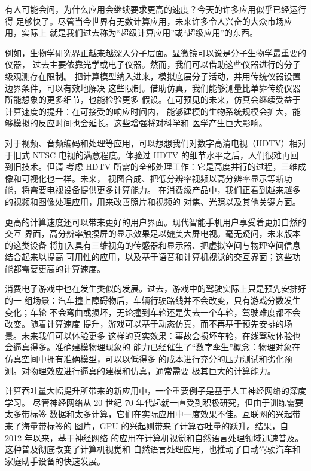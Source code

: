 有人可能会问，为什么应用会继续要求更高的速度？今天的许多应用似乎已经运行得
足够快了。尽管当今世界有无数计算应用，未来许多令人兴奋的大众市场应用，实际上
就是我们过去称为“超级计算应用”或“超级应用”的东西。

例如，生物学研究界正越来越深入分子层面。显微镜可以说是分子生物学最重要的仪器，
过去主要依靠光学或电子仪器。然而，我们可以借助这些仪器进行的分子级观测存在限制。
把计算模型纳入进来，模拟底层分子活动，并用传统仪器设置边界条件，可以有效地解决
这些限制。借助仿真，我们能够测量比单靠传统仪器所能想象的更多细节，也能检验更多
假设。在可预见的未来，仿真会继续受益于计算速度的提升：在可接受的响应时间内，
能够建模的生物系统规模会扩大，能够模拟的反应时间也会延长。这些增强将对科学和
医学产生巨大影响。

对于视频、音频编码和处理等应用，可以想想我们对数字高清电视（HDTV）相对于旧式
NTSC 电视的满意程度。体验过 HDTV 的细节水平之后，人们很难再回到旧技术。但请
考虑 HDTV 所需的全部处理工作：它是高度并行的过程，三维成像和可视化也一样。未来，
视图合成、把低分辨率视频以高分辨率显示等新功能，将需要电视设备提供更多计算能力。
在消费级产品中，我们正看到越来越多的视频和图像处理应用，用来改善照片和视频的
对焦、光照以及其他关键方面。

更高的计算速度还可以带来更好的用户界面。现代智能手机用户享受着更加自然的交互
界面，高分辨率触摸屏的显示效果足以媲美大屏电视。毫无疑问，未来版本的这类设备
将加入具有三维视角的传感器和显示器、把虚拟空间与物理空间信息结合起来以提高
可用性的应用，以及基于语音和计算机视觉的交互界面；这些功能都需要更高的计算速度。

消费电子游戏中也在发生类似的发展。过去，游戏中的驾驶实际上只是预先安排好的一
组场景：汽车撞上障碍物后，车辆行驶路线并不会改变，只有游戏分数发生变化；车轮
不会弯曲或损坏，无论撞到车轮还是失去一个车轮，驾驶难度都不会改变。随着计算速度
提升，游戏可以基于动态仿真，而不再基于预先安排的场景。未来我们可以体验更多
这样的真实效果：事故会损坏车轮，在线驾驶体验也会逼真得多。准确建模物理现象的
能力已经催生了“数字孪生”概念：物理对象在仿真空间中拥有准确模型，可以以低得多
的成本进行充分的压力测试和劣化预测。对物理效应进行逼真的建模和仿真，通常需要
极其巨大的计算能力。

计算吞吐量大幅提升所带来的新应用中，一个重要例子是基于人工神经网络的深度学习。
尽管神经网络从 20 世纪 70 年代起就一直受到积极研究，但由于训练需要太多带标签
数据和太多计算，它们在实际应用中一度效果不佳。互联网的兴起带来了海量带标签的
图片，GPU 的兴起则带来了计算吞吐量的跃升。结果，自 2012 年以来，基于神经网络
的应用在计算机视觉和自然语言处理领域迅速普及。这种普及彻底改变了计算机视觉和
自然语言处理应用，也推动了自动驾驶汽车和家庭助手设备的快速发展。

